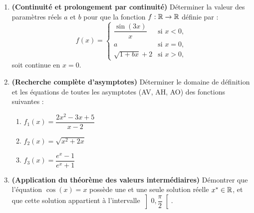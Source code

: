 \begin{enumerate}[label=\textbf{Exercice 2.\arabic* --}]
    \item \textbf{(Continuité et prolongement par continuité)} Déterminer la valeur des paramètres réels $a$ et $b$ pour que la fonction $f : \mathbb{R} \to \mathbb{R}$ définie par :
    \[
        f(x) = \begin{cases}
            \dfrac{\sin(3x)}{x} & \text{si } x < 0, \\
            a & \text{si } x = 0, \\
            \sqrt{1 + bx} + 2 & \text{si } x > 0,
        \end{cases}
    \]
    soit continue en $x = 0$.

    \item \textbf{(Recherche complète d'asymptotes)} Déterminer le domaine de définition et les équations de toutes les asymptotes (AV, AH, AO) des fonctions suivantes :
    \begin{enumerate}
        \item $f_1(x) = \dfrac{2x^2 - 3x + 5}{x - 2}$
        \item $f_2(x) = \sqrt{x^2 + 2x}$
        \item $f_3(x) = \dfrac{e^x - 1}{e^x + 1}$
    \end{enumerate}

    \item \textbf{(Application du théorème des valeurs intermédiaires)} Démontrer que l'équation $\cos(x) = x$ possède une et une seule solution réelle $x^* \in \mathbb{R}$, et que cette solution appartient à l'intervalle $\left]0, \dfrac{\pi}{2}\right[$.
\end{enumerate}
